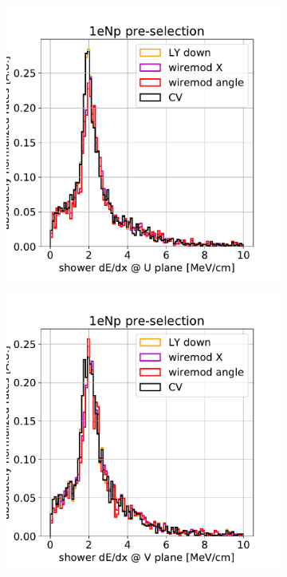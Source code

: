 \documentclass[a4paper]{article}
\begin{document}
\begin{figure}[H] 
\begin{center}
    \begin{subfigure}[b]{0.3\textwidth}
    \centering
    \includegraphics[width=1.00\textwidth]{detsys/shr_tkfit_dedx_U01162020_eLEE_low.pdf}
    \end{subfigure}
    \begin{subfigure}[b]{0.3\textwidth}
    \centering
    \includegraphics[width=1.00\textwidth]{detsys/shr_tkfit_dedx_V01162020_eLEE_low.pdf}

\end{subfigure}
\end{center}
\end{figure}
\end{document}
